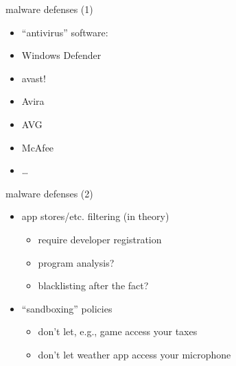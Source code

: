 
\begin{frame}{malware defenses (1)}
    \begin{itemize}
        \item ``antivirus'' software:
        \vspace{.5cm}
        \item Windows Defender
        \item avast!
        \item Avira
        \item AVG
        \item McAfee
        \item \ldots
    \end{itemize}
\end{frame}

\begin{frame}{malware defenses (2)}
    \begin{itemize}
        \item app stores/etc. filtering (in theory)
            \begin{itemize}
            \item require developer registration
            \item program analysis?
            \item blacklisting after the fact?
            \end{itemize}
        \item ``sandboxing'' policies
            \begin{itemize}
            \item don't let, e.g., game access your taxes
            \item don't let weather app access your microphone
            \end{itemize}
    \end{itemize}
\end{frame}

\begin{frame}[plain]
\end{frame}

